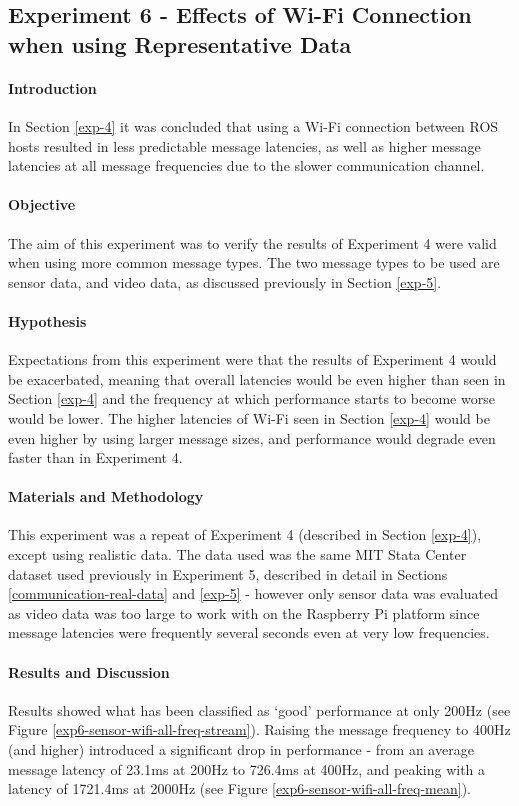 \documentclass[../dissertation.tex]{subfiles}
\begin{document}
\subsection{Experiment 6 - Effects of Wi-Fi Connection when using Representative Data}
\label{experiment-6}

\paragraph{Introduction} In Section \ref{exp-4} it was concluded that using a Wi-Fi connection between ROS hosts resulted in less predictable message latencies, as well as higher message latencies at all message frequencies due to the slower communication channel.

\paragraph{Objective} The aim of this experiment was to verify the results of Experiment 4 were valid when using more common message types. The two message types to be used are sensor data, and video data, as discussed previously in Section \ref{exp-5}.

\paragraph{Hypothesis} Expectations from this experiment were that the results of Experiment 4 would be exacerbated, meaning that overall latencies would be even higher than seen in Section \ref{exp-4} and the frequency at which performance starts to become worse would be lower. The higher latencies of Wi-Fi seen in Section \ref{exp-4} would be even higher by using larger message sizes, and performance would degrade even faster than in Experiment 4.

\paragraph{Materials and Methodology} This experiment was a repeat of Experiment 4 (described in Section \ref{exp-4}), except using realistic data. The data used was the same MIT Stata Center dataset used previously in Experiment 5, described in detail in Sections \ref{communication-real-data} and \ref{exp-5} - however only sensor data was evaluated as video data was too large to work with on the Raspberry Pi platform since message latencies were frequently several seconds even at very low frequencies.

\paragraph{Results and Discussion} Results showed what has been classified as `good' performance at only 200Hz (see Figure \ref{exp6-sensor-wifi-all-freq-stream}). Raising the message frequency to 400Hz (and higher) introduced a significant drop in performance - from an average message latency of 23.1ms at 200Hz to 726.4ms at 400Hz, and peaking with a latency of 1721.4ms at 2000Hz (see Figure \ref{exp6-sensor-wifi-all-freq-mean}).
\end{document}
